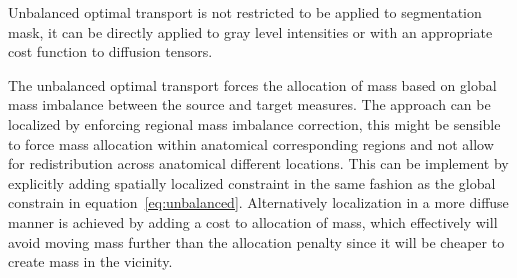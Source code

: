 \documentclass{llncs}
\begin{document}
Unbalanced optimal transport is not restricted to be applied to segmentation
mask, it can be directly applied to gray level intensities or with an
appropriate cost function to diffusion tensors. 

The unbalanced optimal transport forces the allocation of mass based on global
mass imbalance between the source and target measures. The approach can be
localized by enforcing regional mass imbalance correction, this might be
sensible to force mass allocation within anatomical corresponding regions and
not allow for redistribution across anatomical different locations. This can be
implement by explicitly adding spatially localized constraint in the same
fashion as the global constrain in equation~\ref{eq:unbalanced}. Alternatively
localization in a more diffuse manner is achieved by adding a cost to
allocation of mass, which effectively will avoid moving mass further than the
allocation penalty since it will be cheaper to create mass in the vicinity.

\footnotesize


\end{document}

